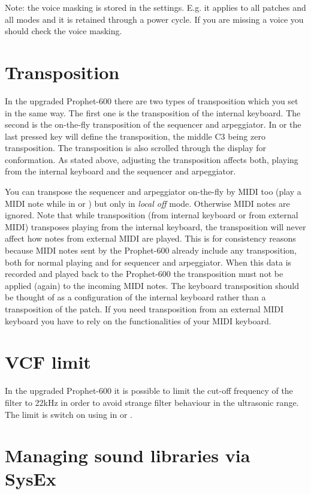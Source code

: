 \documentclass[landscape, 11pt, oneside, twoside]{report}
\newenvironment{flowtext}{\addmargin[0cm]{0cm}}{\endaddmargin} %
\begin{document}
\begin{flowtext}
Note: the voice masking is stored in the settings. E.g. it applies to all patches and all modes and it is retained through a power cycle. If you are missing a voice you should check the voice masking.

\section{Transposition}\label{transposition}

In the upgraded Prophet-600 there are two types of transposition which you set in the same way. The first one is the transposition of the internal keyboard. The second is the on-the-fly transposition of the sequencer and arpeggiator. In \shiftmode or \shiftlock the last pressed key will define the transposition, the middle C3 being zero transposition. The transposition is also scrolled through the display for conformation. As stated above, adjusting the transposition affects both, playing from the internal keyboard and the sequencer and arpeggiator.

You can transpose the sequencer and arpeggiator on-the-fly by MIDI too (play a MIDI note while in \shiftmode or \shiftlock) but only in \textit{local off} mode. Otherwise MIDI notes are ignored. Note that while transposition (from internal keyboard or from external MIDI) transposes playing from the internal keyboard, the transposition will never affect how notes from external MIDI are played. This is for consistency reasons because MIDI notes sent by the Prophet-600 already include any transposition, both for normal playing and for sequencer and arpeggiator. When this data is recorded and played back to the Prophet-600 the transposition must not be applied (again) to the incoming MIDI notes. The keyboard transposition should be thought of as a configuration of the internal keyboard rather than a transposition of the patch. If you need transposition from an external MIDI keyboard you have to rely on the functionalities of your MIDI keyboard. 

\section{VCF limit}\label{limitsett}

In the upgraded Prophet-600 it is possible to limit the cut-off frequency of the filter to 22kHz in order to avoid strange filter behaviour in the ultrasonic range. The limit is switch on using  in \shiftmode or \shiftlock. 

\section{Managing sound libraries via SysEx}\label{patchmgmt}


\end{flowtext}
\end{document}
